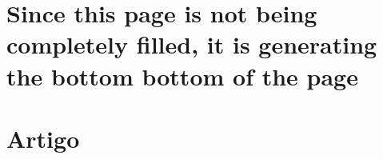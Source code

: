 %
%


\lang
{\chapter[Page not filled]{Since this page is not being completely filled, it is generating the bottom bottom of the page}}
{\chapter[Artigo]{Artigo}}







